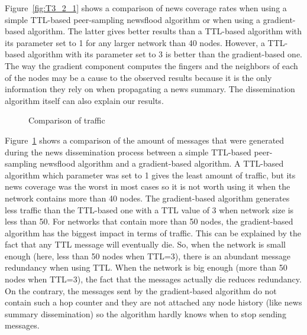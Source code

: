\documentclass[conference]{IEEEtran}
\begin{document}
Figure~\ref{fig:T3_2_1} shows a comparison of news coverage rates when using a simple TTL-based peer-sampling newsflood algorithm or when using a gradient-based algorithm.
The latter gives better results than a TTL-based algorithm with its parameter set to 1 for any larger network than 40 nodes.
However, a TTL-based algorithm with its parameter set to 3 is better than the gradient-based one.
The way the gradient component computes the fingers and the neighbors of each of the nodes may be a cause to the observed results because it is the only information they rely on when propagating a news summary.
The dissemination algorithm itself can also explain our results.

\begin{figure}
\caption{Comparison of traffic}
\label{fig:T3_2_2}
\end{figure}

Figure~\ref{fig:T3_2_2} shows a comparison of the amount of messages that were generated during the news dissemination process between a simple TTL-based peer-sampling newsflood algorithm and a gradient-based algorithm.
A TTL-based algorithm which parameter was set to 1 gives the least amount of traffic, but its news coverage was the worst in most cases so it is not worth using it when the network contains more than 40 nodes.
The gradient-based algorithm generates less traffic than the TTL-based one with a TTL value of 3 when network size is less than 50. For networks that contain more than 50 nodes, the gradient-based algorithm has the biggest impact in terms of traffic.
This can be explained by the fact that any TTL message will eventually die. So, when the network is small enough (here, less than 50 nodes when TTL=3), there is an abundant message redundancy when using TTL. When the network is big enough (more than 50 nodes when TTL=3), the fact that the messages actually die reduces redundancy.
On the contrary, the messages sent by the gradient-based algorithm do not contain such a hop counter and they are not attached any node history (like news summary dissemination) so the algorithm hardly knows when to stop sending messages.
\end{document}
